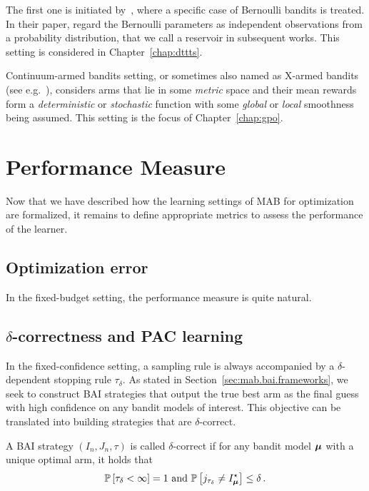 The first one is initiated by~\cite{berry1997infinite}, where a specific case of Bernoulli bandits is treated. In their paper, \cite{berry1997infinite} regard the Bernoulli parameters as independent observations from a probability distribution, that we call a \gls{reservoir} in subsequent works. This setting is considered in Chapter~\ref{chap:dttts}.

Continuum-armed bandits setting, or sometimes also named as \gls{X-armed bandits} (see e.g.~\citealt{bubeck2010x}), considers arms that lie in some \emph{metric} space and their mean rewards form a \emph{deterministic} or \emph{stochastic} function with some \emph{global} or \emph{local} smoothness being assumed. This setting is the focus of Chapter~\ref{chap:gpo}.

\section{Performance Measure}\label{sec:mab.performance}

Now that we have described how the learning settings of MAB for optimization are formalized, it remains to define appropriate metrics to assess the performance of the learner.

\subsection{Optimization error}\label{sec:mab.performance.optim}

In the fixed-budget setting, the performance measure is quite natural.

\subsection{$\delta$-correctness and PAC learning}\label{sec:mab.performance.pac}

In the fixed-confidence setting, a sampling rule is always accompanied by a $\delta$-dependent stopping rule $\tau_{\delta}$. As stated in Section~\ref{sec:mab.bai.frameworks}, we seek to construct BAI strategies that output the true best arm as the final guess with high confidence on any bandit models of interest. This objective can be translated into building strategies that are $\delta$-correct.

\begin{definition}\label{def:mab.delta}
\begin{leftbar}[defnbar]
A BAI strategy $(I_n,J_n,\tau)$ is called $\delta$-correct if for any bandit model ${\boldsymbol \mu}$ with a unique optimal arm, it holds that
\[
	\mathbb{P}\left[\tau_\delta < \infty\right] = 1 \text{ and } \mathbb{P}\left[j_{\tau_\delta}\neq I_{{\boldsymbol \mu}}^{\star}\right] \leq \delta\,.
\]
\end{leftbar}
\end{definition}

